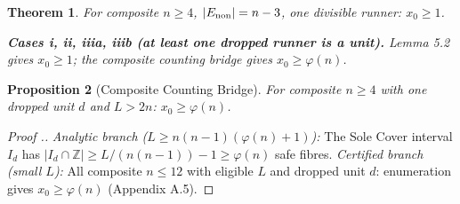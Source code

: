 \documentclass[11pt,a4paper]{article}
\theoremstyle{plain}
\newtheorem{theorem}{Theorem}[section]
\newtheorem{proposition}[theorem]{Proposition}
\theoremstyle{definition}
\theoremstyle{remark}
\begin{document}
\begin{theorem}
For composite $n \geq 4$, $|E_{\rm non}|=n-3$, one divisible runner: $x_0 \geq 1$.

\textbf{Cases i, ii, iiia, iiib (at least one dropped runner is a unit).} Lemma 5.2 gives $x_0 \geq 1$; the composite counting bridge gives $x_0 \geq \varphi(n)$.

\end{theorem}


\begin{proposition}[Composite Counting Bridge]
For composite $n \geq 4$ with one dropped unit $d$ and $L > 2n$: $x_0 \geq \varphi(n)$.

\end{proposition}

\begin{proof}[Proof .]
\textit{Analytic branch ($L \geq n(n-1)(\varphi(n)+1)$):} The Sole Cover interval $I_d$ has $|I_d \cap \mathbb{Z}| \geq L/(n(n-1)) - 1 \geq \varphi(n)$ safe fibres. \textit{Certified branch (small $L$):} All composite $n \leq 12$ with eligible $L$ and dropped unit $d$: enumeration gives $x_0 \geq \varphi(n)$ (Appendix A.5).
\end{proof}
\end{document}
